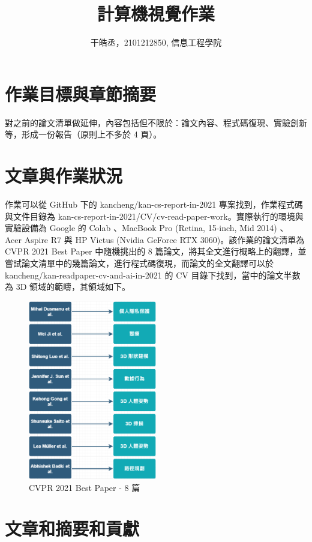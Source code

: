 \documentclass[10pt,UTF8]{ctexart}
\title{計算機視覺作業}
\author{干皓丞，2101212850, 信息工程學院}
\begin{document}
\maketitle


\section{作業目標與章節摘要}

對之前的論文清單做延伸，內容包括但不限於：論文內容、程式碼復現、實驗創新等，形成一份報告（原則上不多於 4 頁）。

\section{文章與作業狀況}

作業可以從 GitHub 下的 kancheng/kan-cs-report-in-2021 專案找到，作業程式碼與文件目錄為 kan-cs-report-in-2021/CV/cv-read-paper-work。實際執行的環境與實驗設備為 Google 的 Colab 、MacBook Pro (Retina, 15-inch, Mid 2014) 、 Acer Aspire R7 與 HP Victus (Nvidia GeForce RTX 3060)。該作業的論文清單為 CVPR 2021 Best Paper 中隨機挑出的 8 篇論文，將其全文進行概略上的翻譯，並嘗試論文清單中的幾篇論文，進行程式碼復現，而論文的全文翻譯可以於 kancheng/kan-readpaper-cv-and-ai-in-2021 的 CV 目錄下找到，當中的論文半數為 3D 領域的範疇，其領域如下。
\begin{figure}[H]
\centering 
\includegraphics[width=0.50\textwidth]{m1.png} 
\caption{CVPR 2021 Best Paper - 8 篇}
\label{Test}
\end{figure}

\section{文章和摘要和貢獻}
\end{document}
